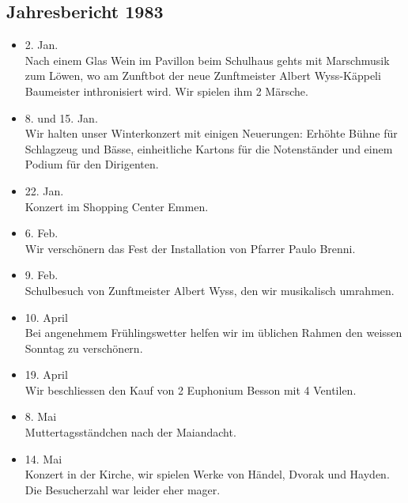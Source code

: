 \subsection{Jahresbericht 1983}

\begin{history}


    \begin{itemize}

        \item[]2. Jan.\\
        Nach einem Glas Wein im Pavillon beim Schulhaus gehts mit Marschmusik
        zum Löwen, wo am Zunftbot der neue Zunftmeister Albert Wyss-Käppeli
        Baumeister inthronisiert wird. Wir spielen ihm 2 Märsche.

        \item[]8. und 15. Jan.\\
        Wir halten unser Winterkonzert mit einigen Neuerungen: Erhöhte Bühne für
        Schlagzeug und Bässe, einheitliche Kartons für die Notenständer und
        einem Podium für den Dirigenten.

        \item[]22. Jan.\\
        Konzert im Shopping Center Emmen.

        \item[]6. Feb.\\
        Wir verschönern das Fest der Installation von Pfarrer Paulo Brenni.

        \item[]9. Feb.\\
        Schulbesuch von Zunftmeister Albert Wyss, den wir musikalisch umrahmen.

        \item[]10. April\\
        Bei angenehmem Frühlingswetter helfen wir im üblichen Rahmen den weissen
        Sonntag zu verschönern.

        \item[]19. April\\
        Wir beschliessen den Kauf von 2 Euphonium Besson mit 4 Ventilen.

        \item[]8. Mai\\
        Muttertagsständchen nach der Maiandacht.

        \item[]14. Mai\\
        Konzert in der Kirche, wir spielen Werke von Händel, Dvorak und Hayden.
        Die Besucherzahl war leider eher mager.


\end{itemize}
\end{history}
